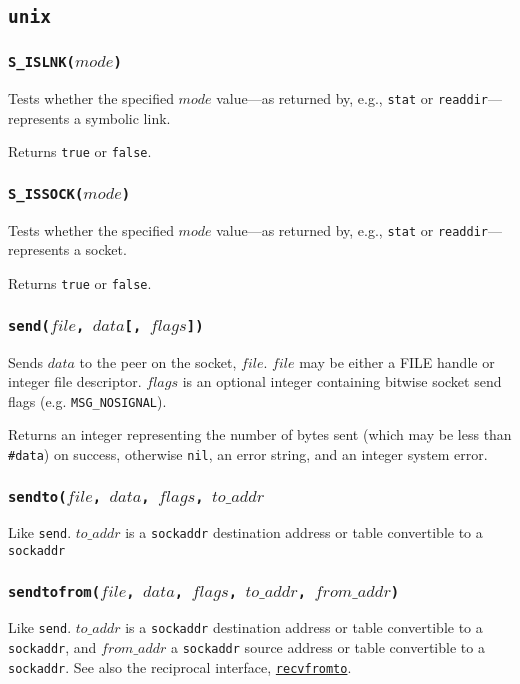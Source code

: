 \documentclass[11pt, oneside]{memoir}
\newcommand*{\true}[0]{\texttt{true}\xspace}
\newcommand*{\false}[0]{\texttt{false}\xspace}
\newcommand*{\nil}[0]{\texttt{nil}\xspace}
\newcommand*{\syscall}[1]{\texttt{#1}\xspace}
\newcommand*{\fn}[1]{\texttt{#1}\xspace}
\newcommand*{\otherwise}[1]{otherwise #1, an error string, and an integer system error}
\newcommand*{\sockaddr}[0]{\texttt{sockaddr}\xspace}
\newcommand*{\seefn}[1]{\hyperref[#1]{\fn{#1}}\xspace}
\newcounter{toccols}
\newenvironment{Module}[1]{
	\subsection{\texttt{#1}}
	\addtocontents{toc}{
		\protect\begin{multicols}{\value{toccols}}
	}
}{
	\addtocontents{toc}{\protect\end{multicols}}
}
\begin{document}
\begin{Module}{unix}
\subsubsection[\fn{S\_ISLNK}]{\fn{S\_ISLNK($mode$)}}

Tests whether the specified $mode$ value---as returned by, e.g., \syscall{stat} or \syscall{readdir}---represents a symbolic link.

Returns \true or \false.

\subsubsection[\fn{S\_ISSOCK}]{\fn{S\_ISSOCK($mode$)}}

Tests whether the specified $mode$ value---as returned by, e.g., \syscall{stat} or \syscall{readdir}---represents a socket.

Returns \true or \false.

\subsubsection[\fn{send}]{\fn{send($file$, $data$[, $flags$])}}

Sends $data$ to the peer on the socket, $file$. $file$ may be either a FILE handle or integer file descriptor. $flags$ is an optional integer containing bitwise socket send flags (e.g. \texttt{MSG\_NOSIGNAL}).

Returns an integer representing the number of bytes sent (which may be less than \texttt{\#data}) on success, \otherwise{\nil}.

\subsubsection[\fn{sendto}]{\fn{sendto($file$, $data$, $flags$, $to\_addr$}}

Like \syscall{send}. $to\_addr$ is a \sockaddr destination address or table convertible to a \sockaddr

\subsubsection[\fn{sendtofrom}]{\fn{sendtofrom($file$, $data$, $flags$, $to\_addr$, $from\_addr$)}}

\label{sendtofrom}

Like \syscall{send}. $to\_addr$ is a \sockaddr destination address or table convertible to a \sockaddr, and $from\_addr$ a \sockaddr source address or table convertible to a \sockaddr. See also the reciprocal interface, \seefn{recvfromto}.


\end{Module}
\end{document}

